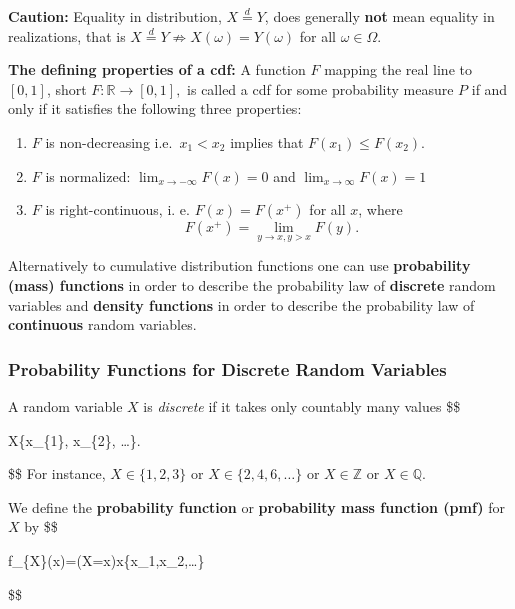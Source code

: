 \documentclass[
  letterpaper,
  DIV=11,
  numbers=noendperiod]{scrreprt}
\theoremstyle{definition}
\theoremstyle{plain}
\theoremstyle{plain}
\theoremstyle{remark}
\begin{document}
\textbf{Caution:} Equality in distribution, \(X\overset{d}{=}Y\), does
generally \textbf{not} mean equality in realizations, that is
\(X\overset{d}{=}Y \not\Rightarrow X(\omega)=Y(\omega)\) for all
\(\omega\in\Omega\).

\textbf{The defining properties of a cdf:} A function \(F\) mapping the
real line to \([0,1]\), short \(F:\mathbb{R}\to[0,1],\) is called a cdf
for some probability measure \(P\) if and only if it satisfies the
following three properties:

\begin{enumerate}
\def\labelenumi{\arabic{enumi}.}
\item
  \(F\) is non-decreasing i.e.~\(x_{1}<x_{2}\) implies that
  \(F\left(x_{1}\right) \leq F\left(x_{2}\right)\).
\item
  \(F\) is normalized: \(\lim_{x\rightarrow-\infty} F(x)=0\) and
  \(\lim_{x \rightarrow \infty} F(x)=1\)
\item
  \(F\) is right-continuous, i. e. \(F(x)=F\left(x^{+}\right)\) for all
  \(x\), where \[
    F\left(x^{+}\right)=\lim_{y\to x, y>x} F(y).
    \]
\end{enumerate}

Alternatively to cumulative distribution functions one can use
\textbf{probability (mass) functions} in order to describe the
probability law of \textbf{discrete} random variables and
\textbf{density functions} in order to describe the probability law of
\textbf{continuous} random variables.

\hypertarget{probability-functions-for-discrete-random-variables}{%
\subsubsection{Probability Functions for Discrete Random
Variables}\label{probability-functions-for-discrete-random-variables}}

A random variable \(X\) is \textit{discrete} if it takes only countably
many values \$\$

X\in\{x\_\{1\}, x\_\{2\}, \ldots\}.

\$\$ For instance, \(X\in\{1,2,3\}\) or \(X\in\{2,4,6,\dots\}\) or
\(X\in\mathbb{Z}\) or \(X\in\mathbb{Q}\).

We define the \textbf{probability function} or \textbf{probability mass
function (pmf)} for \(X\) by \$\$

f\_\{X\}(x)=(X=x)\quad{}\quad x\in\{x\_1,x\_2,\dots\}

\$\$
\end{document}
